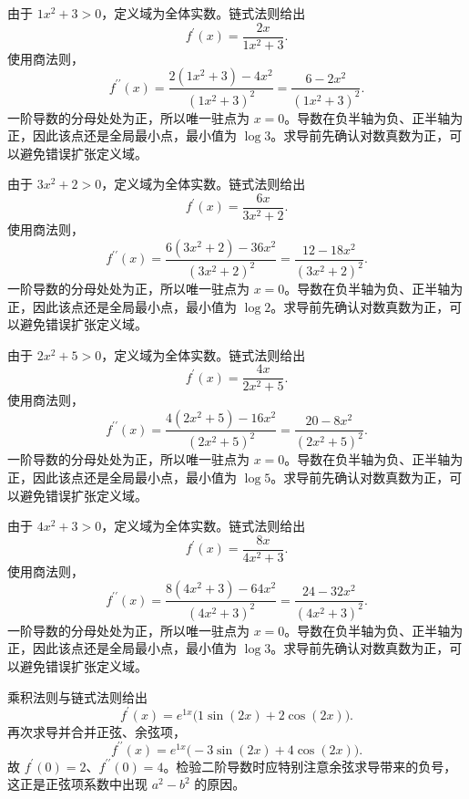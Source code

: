 \documentclass[12pt,fontset=fandol]{ctexart}
\begin{document}
\begin{solve}\label{ans:c8q15}
由于 $1x^2+3>0$，定义域为全体实数。链式法则给出
\[
f^{\prime}(x)=\frac{2x}{1x^2+3}.
\]
使用商法则，
\[
f^{\prime\prime}(x)=\frac{2(1x^2+3)-4x^2}{(1x^2+3)^2}=\frac{6-2x^2}{(1x^2+3)^2}.
\]
一阶导数的分母处处为正，所以唯一驻点为 $x=0$。导数在负半轴为负、正半轴为正，因此该点还是全局最小点，最小值为 $\log 3$。求导前先确认对数真数为正，可以避免错误扩张定义域。
\end{solve}

\begin{solve}\label{ans:c8q16}
由于 $3x^2+2>0$，定义域为全体实数。链式法则给出
\[
f^{\prime}(x)=\frac{6x}{3x^2+2}.
\]
使用商法则，
\[
f^{\prime\prime}(x)=\frac{6(3x^2+2)-36x^2}{(3x^2+2)^2}=\frac{12-18x^2}{(3x^2+2)^2}.
\]
一阶导数的分母处处为正，所以唯一驻点为 $x=0$。导数在负半轴为负、正半轴为正，因此该点还是全局最小点，最小值为 $\log 2$。求导前先确认对数真数为正，可以避免错误扩张定义域。
\end{solve}

\begin{solve}\label{ans:c8q17}
由于 $2x^2+5>0$，定义域为全体实数。链式法则给出
\[
f^{\prime}(x)=\frac{4x}{2x^2+5}.
\]
使用商法则，
\[
f^{\prime\prime}(x)=\frac{4(2x^2+5)-16x^2}{(2x^2+5)^2}=\frac{20-8x^2}{(2x^2+5)^2}.
\]
一阶导数的分母处处为正，所以唯一驻点为 $x=0$。导数在负半轴为负、正半轴为正，因此该点还是全局最小点，最小值为 $\log 5$。求导前先确认对数真数为正，可以避免错误扩张定义域。
\end{solve}

\begin{solve}\label{ans:c8q18}
由于 $4x^2+3>0$，定义域为全体实数。链式法则给出
\[
f^{\prime}(x)=\frac{8x}{4x^2+3}.
\]
使用商法则，
\[
f^{\prime\prime}(x)=\frac{8(4x^2+3)-64x^2}{(4x^2+3)^2}=\frac{24-32x^2}{(4x^2+3)^2}.
\]
一阶导数的分母处处为正，所以唯一驻点为 $x=0$。导数在负半轴为负、正半轴为正，因此该点还是全局最小点，最小值为 $\log 3$。求导前先确认对数真数为正，可以避免错误扩张定义域。
\end{solve}

\begin{solve}\label{ans:c8q19}
乘积法则与链式法则给出
\[
f^{\prime}(x)=e^{1x}\bigl(1\sin(2x)+2\cos(2x)\bigr).
\]
再次求导并合并正弦、余弦项，
\[
f^{\prime\prime}(x)=e^{1x}\bigl(-3\sin(2x)+4\cos(2x)\bigr).
\]
故 $f^{\prime}(0)=2$、$f^{\prime\prime}(0)=4$。检验二阶导数时应特别注意余弦求导带来的负号，这正是正弦项系数中出现 $a^2-b^2$ 的原因。
\end{solve}
\end{document}
